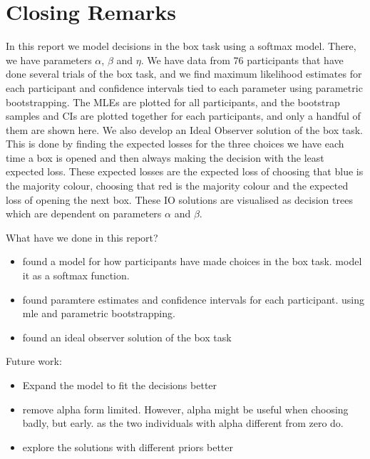 \chapter{Closing Remarks}
In this report we model decisions in the box task using a softmax model. There, we have parameters $\alpha$, $\beta$ and $\eta$. We have data from 76 participants that have done several trials of the box task, and we find maximum likelihood estimates for each participant and confidence intervals tied to each parameter using parametric bootstrapping. The MLEs are plotted for all participants, and the bootstrap samples and CIs are plotted together for each participants, and only a handful of them are shown here. 
We also develop an Ideal Observer solution of the box task. This is done by finding the expected losses for the three choices we have each time a box is opened and then always making the decision with the least expected loss. These expected losses are the expected loss of choosing that blue is the majority colour, choosing that red is the majority colour and the expected loss of opening the next box. These IO solutions are visualised as decision trees which are dependent on parameters $\alpha$ and $\beta$.



What have we done in this report? 
\begin{itemize}
    \item found a model for how participants have made choices in the box task. model it as a softmax function. 
    \item found paramtere estimates and confidence intervals for each participant. using mle and parametric bootstrapping.
    \item found an ideal observer solution of the box task
\end{itemize}




Future work:
\begin{itemize}
    \item Expand the model to fit the decisions better
    \item remove alpha form limited. However, alpha might be useful when choosing badly, but early. as the two individuals with alpha different from zero do. 
    \item explore the solutions with different priors better
\end{itemize}

